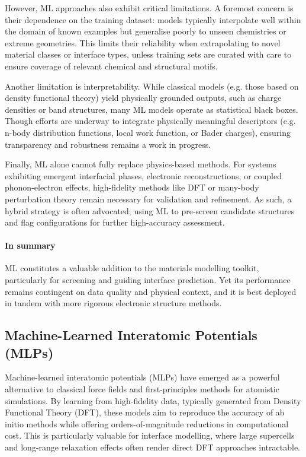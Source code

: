 However, ML approaches also exhibit critical limitations. A foremost concern is their dependence on the training
dataset: models typically interpolate well within the domain of known examples but generalise poorly to unseen
chemistries or extreme geometries. This limits their reliability when extrapolating to novel material classes or
interface types, unless training sets are curated with care to ensure coverage of relevant chemical and structural
motifs.

Another limitation is interpretability. While classical models (e.g. those based on density functional theory) yield
physically grounded outputs, such as charge densities or band structures, many ML models operate as statistical black
boxes. Though efforts are underway to integrate physically meaningful descriptors (e.g. n-body distribution functions,
local work function, or Bader charges), ensuring transparency and robustness remains a work in progress.

Finally, ML alone cannot fully replace physics-based methods. For systems exhibiting emergent interfacial phases,
electronic reconstructions, or coupled phonon-electron effects, high-fidelity methods like DFT or many-body
perturbation theory remain necessary for validation and refinement. As such, a hybrid strategy is often advocated;
using ML to pre-screen candidate structures and flag configurations for further high-accuracy assessment.

\paragraph{In summary} ML constitutes a valuable addition to the materials modelling toolkit, particularly for
screening and guiding interface prediction. Yet its performance remains contingent on data quality and physical
context, and it is best deployed in tandem with more rigorous electronic structure methods.

\subsection{Machine-Learned Interatomic Potentials (MLPs)}

Machine-learned interatomic potentials (MLPs) have emerged as a powerful alternative to classical force fields and
first-principles methods for atomistic simulations. By learning from high-fidelity data, typically generated from
Density Functional Theory (DFT), these models aim to reproduce the accuracy of ab initio methods while offering
orders-of-magnitude reductions in computational cost. This is particularly valuable for interface modelling, where
large supercells and long-range relaxation effects often render direct DFT approaches intractable.

